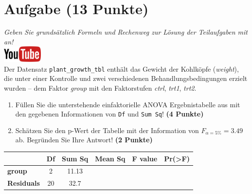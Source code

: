 \documentclass[a4paper, 10pt]{scrartcl}\usepackage[]{graphicx}\usepackage[]{xcolor}
\begin{document}
\clearpage

\section{Aufgabe \hfill (13 Punkte)}

\textit{Geben Sie grunds{\"a}tzlich Formeln und Rechenweg zur L{\"o}sung der
  Teilaufgaben mit an!} \\[1Ex]

\hfill\href{https://youtu.be/49hvImMwVyE}{\includegraphics[width =
  2cm]{img/youtube}}\\[1Ex]


Der Datensatz \texttt{plant\_growth\_tbl} enth{\"a}lt das Gewicht der Kohlk{\"o}pfe
(\textit{weight}), die unter einer Kontrolle und zwei verschiedenen
Behandlungsbedingungen erzielt wurden -- dem Faktor \textit{group} mit den
Faktorstufen \textit{ctrl}, \textit{trt1}, \textit{trt2}.



\begin{enumerate}
\item F{\"u}llen Sie die unterstehende einfaktorielle ANOVA Ergebnistabelle aus
  mit den gegebenen Informationen von \texttt{Df} und \texttt{Sum Sq}!
  \textbf{(4 Punkte)}
\item Sch{\"a}tzen Sie den p-Wert der Tabelle mit der Information von
  $F_{\alpha = 5\%} = 3.49$ ab. Begr{\"u}nden Sie Ihre
  Antwort! \textbf{(2 Punkte)}
\end{enumerate}

\vspace{1Ex}

\begin{center}
  \Large
  \begin{tabular}{l|c|c|c|c|c}
     & \textbf{Df} & \textbf{Sum Sq} & \textbf{Mean Sq} & \textbf{F value} & \textbf{Pr(>F)} \strut\\
    \hline
   \textbf{group}  & 2 & 11.13 &  &  &  \strut\\
    \hline
   \textbf{Residuals}  & 20 & 32.7 &  &  &  \strut\\
  \end{tabular}
\end{center}
\end{document}
